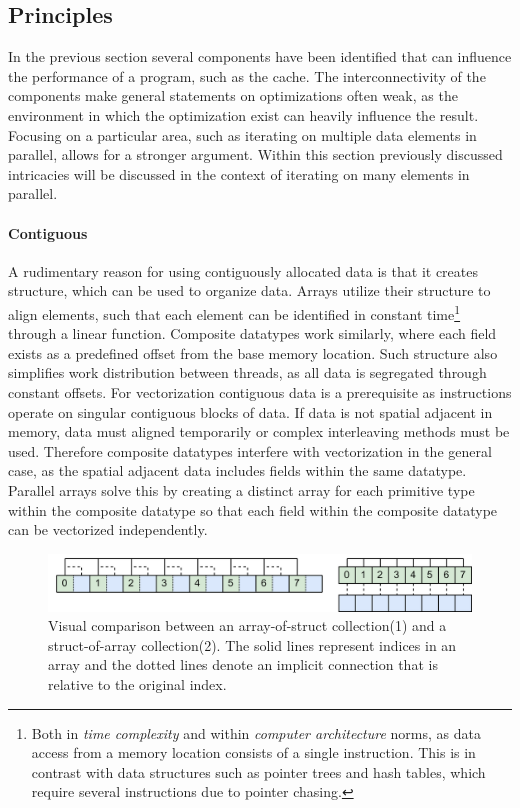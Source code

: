 \documentclass{article}
\begin{document}
\newpage

\subsection{Principles}

In the previous section several components have been identified that can influence the performance of a program, such as the cache.
The interconnectivity of the components make general statements on optimizations often weak, as the environment in which the optimization exist can heavily influence the result.
Focusing on a particular area, such as iterating on multiple data elements in parallel, allows for a stronger argument.
Within this section previously discussed intricacies will be discussed in the context of iterating on many elements in parallel.

\paragraph{Contiguous} 

A rudimentary reason for using contiguously allocated data is that it creates structure, which can be used to organize data.
Arrays utilize their structure to align elements, such that each element can be identified in constant time\footnote{Both in {\it time complexity} and within {\it computer architecture} norms, as data access from a memory location consists of a single instruction. This is in contrast with data structures such as pointer trees and hash tables, which require several instructions due to pointer chasing. } through a linear function.
Composite datatypes work similarly, where each field exists as a predefined offset from the base memory location.
Such structure also simplifies work distribution between threads, as all data is segregated through constant offsets.
For vectorization contiguous data is a prerequisite as instructions operate on singular contiguous blocks of data.
If data is not spatial adjacent in memory, data must aligned temporarily or complex interleaving methods must be used\cite{interleaved-SIMD}.
Therefore composite datatypes interfere with vectorization in the general case, as the spatial adjacent data includes fields within the same datatype.
Parallel arrays solve this by creating a distinct array for each primitive type within the composite datatype so that each field within the composite datatype can be vectorized independently.

\begin{figure}[ht]
    \centering
    \includegraphics[scale=0.082]{Performance6.png}
    \caption
    {
        Visual comparison between an array-of-struct collection(1) and a struct-of-array collection(2). 
        The solid lines represent indices in an array and the dotted lines denote an implicit connection that is relative to the original index.
    }
\end{figure}
\end{document}
